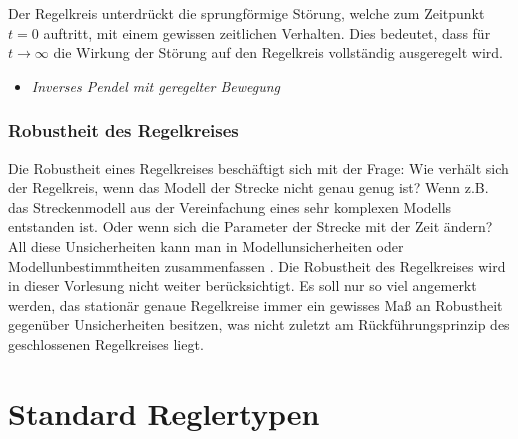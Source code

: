 %
Der Regelkreis unterdrückt die sprungförmige Störung, welche zum Zeitpunkt $t=0$ auftritt, mit einem gewissen zeitlichen Verhalten. Dies bedeutet, dass für $t\rightarrow\infty$ die Wirkung der Störung auf den Regelkreis vollständig ausgeregelt wird.
%
\begin{python}{}{}
	\begin{itemize}
		\item \textit{Inverses Pendel mit geregelter Bewegung}
	\end{itemize}
\end{python}
%
\subsubsection{Robustheit des Regelkreises}
%
Die Robustheit eines Regelkreises beschäftigt sich mit der Frage: Wie verhält sich der Regelkreis, wenn das Modell der Strecke nicht genau genug ist? Wenn z.B. das Streckenmodell aus der Vereinfachung eines sehr komplexen Modells entstanden ist. Oder wenn sich die Parameter der Strecke mit der Zeit ändern? All diese Unsicherheiten kann man in Modellunsicherheiten oder Modellunbestimmtheiten zusammenfassen \cite{Lunze10}. Die Robustheit des Regelkreises wird in dieser Vorlesung nicht weiter berücksichtigt. Es soll nur so viel angemerkt werden, das stationär genaue Regelkreise immer ein gewisses Maß an Robustheit gegenüber Unsicherheiten besitzen, was nicht zuletzt am Rückführungsprinzip des geschlossenen Regelkreises liegt. 
%
\section{Standard Reglertypen}
%
